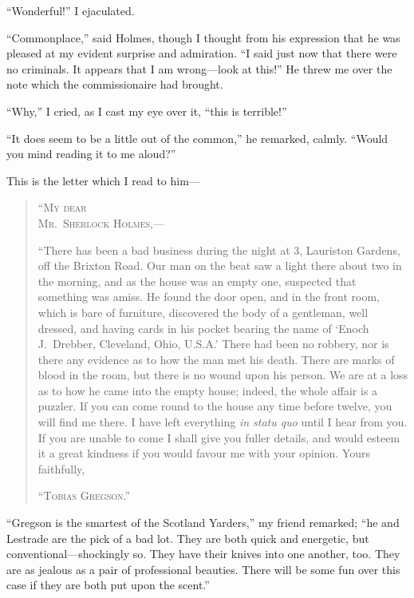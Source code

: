 \documentclass[12pt,english,oneside]{book}
\newcommand{\noun}[1]{\textsc{#1}}
\newcommand{\mdsh}[1]{\mbox{#1}\linebreak[1]}
\begin{document}
{}``Wonderful!'' I ejaculated.

{}``Commonplace,'' said Holmes, though I thought from his expression
that he was pleased at my evident surprise and admiration. {}``I
said just now that there were no criminals. It appears that I am wrong\mdsh{---}look
at this!'' He threw me over the note which the commissionaire had
brought.

{}``Why,'' I cried, as I cast my eye over it, {}``this is terrible!''

{}``It does seem to be a little out of the common,'' he remarked,
calmly. {}``Would you mind reading it to me aloud?''

This is the letter which I read to him\mdsh{---}

\begin{quotation}
\noindent {}``\noun{My dear }\\
\noun{Mr.\ Sherlock Holmes},\mdsh{---}

{}``There has been a bad business during the night at 3, Lauriston
Gardens, off the Brixton Road. Our man on the beat saw a light there
about two in the morning, and as the house was an empty one, suspected
that something was amiss. He found the door open, and in the front
room, which is bare of furniture, discovered the body of a gentleman,
well dressed, and having cards in his pocket bearing the name of `Enoch
J.\ Drebber, Cleveland, Ohio, U.S.A.' There had been no robbery,
nor is there any evidence as to how the man met his death. There are
marks of blood in the room, but there is no wound upon his person.
We are at a loss as to how he came into the empty house; indeed, the
whole affair is a puzzler. If you can come round to the house any
time before twelve, you will find me there. I have left everything
\textit{in statu quo} until I hear from you. If you are unable to
come I shall give you fuller details, and would esteem it a great
kindness if you would favour me with your opinion. Yours faithfully, 

\begin{flushright}{}``\noun{Tobias Gregson}.''\end{flushright}
\end{quotation}
{}``Gregson is the smartest of the Scotland Yarders,'' my friend
remarked; {}``he and Lestrade are the pick of a bad lot. They are
both quick and energetic, but conventional\mdsh{---}shockingly so.
They have their knives into one another, too. They are as jealous
as a pair of professional beauties. There will be some fun over this
case if they are both put upon the scent.''
\end{document}
